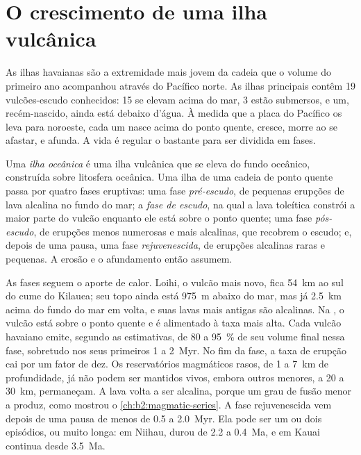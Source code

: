 \section{O crescimento de uma ilha vulcânica}\label{sec:b2:oceanic-islands:growth}

As ilhas havaianas são a extremidade mais jovem da cadeia que o volume do primeiro ano acompanhou através do
Pacífico norte. As ilhas principais contêm 19 vulcões-escudo conhecidos: 15 se elevam acima do mar,
3 estão submersos, e um, recém-nascido, ainda está debaixo d'água. À medida que a placa do Pacífico os leva
para noroeste, cada um nasce acima do ponto quente, cresce, morre ao se afastar, e afunda. A vida é
regular o bastante para ser dividida em fases.

\begin{definition}\label{def:b2:oceanic-islands:stages}
Uma \emph{ilha oceânica} é uma ilha vulcânica que se eleva do fundo
oceânico, construída sobre litosfera oceânica. Uma ilha de uma cadeia de ponto quente passa por quatro fases
eruptivas: uma fase \emph{pré-escudo}, de pequenas erupções de lava alcalina no fundo do mar; a
\emph{fase de escudo}, na qual a lava toleítica constrói a maior parte do vulcão
enquanto ele está sobre o ponto quente; uma fase \emph{pós-escudo}, de erupções menos numerosas e mais alcalinas,
que recobrem o escudo; e, depois de uma pausa, uma fase \emph{rejuvenescida}, de erupções alcalinas raras e
pequenas. A erosão e o afundamento então assumem.
\end{definition}

As fases seguem o aporte de calor. Loihi, o vulcão mais novo, fica \qty{54}{km} ao sul do
cume do Kilauea; seu topo ainda está \qty{975}{m} abaixo do mar, mas já \qty{2.5}{km} acima do
fundo do mar em volta, e suas lavas mais antigas são alcalinas. Na , o vulcão está sobre
o ponto quente e é alimentado à taxa mais alta. Cada vulcão havaiano emite, segundo as estimativas, de 80 a
\qty{95}{\percent} de seu volume final nessa fase, sobretudo nos seus primeiros 1 a \qty{2}{Myr}.
No fim da fase, a taxa de erupção cai por um fator de dez. Os reservatórios magmáticos rasos, de 1
a \qty{7}{km} de profundidade, já não podem ser mantidos vivos, embora outros menores, a 20 a \qty{30}{km},
permaneçam. A lava volta a ser alcalina, porque um grau de fusão menor a produz, como
mostrou o \cref{ch:b2:magmatic-series}. A fase rejuvenescida vem depois de uma pausa de menos de 0.5
a \qty{2.0}{Myr}. Ela pode ser um ou dois episódios, ou muito longa: em Niihau, durou de 2.2 a
\qty{0.4}{Ma}, e em Kauai continua desde \qty{3.5}{Ma}.

